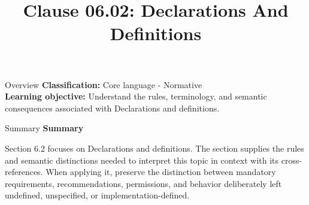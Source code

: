 \documentclass[10pt,letterpaper]{article}
\title{Clause 06.02: Declarations And Definitions}
\author{}
\date{}
\begin{document}
\maketitle
\begin{CornellOverviewBox}{Overview}
\textbf{Classification:} Core language - Normative\\[2pt]
\textbf{Learning objective:} Understand the rules, terminology, and semantic consequences associated with Declarations and definitions.
\end{CornellOverviewBox}\begin{CornellSummaryBox}{Summary}
{\sffamily\bfseries\color{Accent} Summary}\par\vspace{3pt}Section 6.2 focuses on Declarations and definitions. The section supplies the rules and semantic distinctions needed to interpret this topic in context with its cross-references. When applying it, preserve the distinction between mandatory requirements, recommendations, permissions, and behavior deliberately left undefined, unspecified, or implementation-defined.
\end{CornellSummaryBox}
\end{document}
